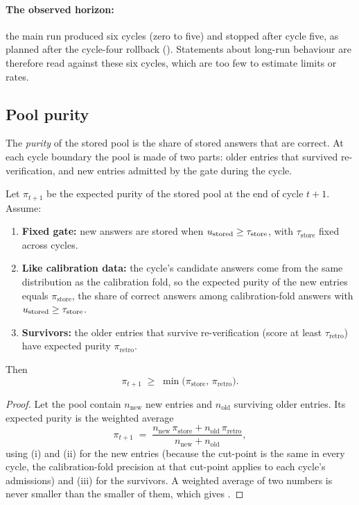 

\paragraph{The observed horizon:} the main run produced six cycles (zero to five) and stopped after cycle five, as planned after the cycle-four rollback (). Statements about long-run behaviour are therefore read against these six cycles, which are too few to estimate limits or rates.

\subsection{Pool purity}
\label{sec:theorem-purity}

The \emph{purity} of the stored pool is the share of stored answers that are correct. At each cycle boundary the pool is made of two parts: older entries that survived re-verification, and new entries admitted by the gate during the cycle.

\begin{theorem}
\label{thm:purity}
Let $\pi_{t+1}$ be the expected purity of the stored pool at the end of cycle $t+1$. Assume:
\begin{enumerate}[label=(\roman*)]
    \item \textbf{Fixed gate:} new answers are stored when $u_{\text{stored}} \ge \tau_{\text{store}}$, with $\tau_{\text{store}}$ fixed across cycles.
    \item \textbf{Like calibration data:} the cycle's candidate answers come from the same distribution as the calibration fold, so the expected purity of the new entries equals $\pi_{\text{store}}$, the share of correct answers among calibration-fold answers with $u_{\text{stored}} \ge \tau_{\text{store}}$.
    \item \textbf{Survivors:} the older entries that survive re-verification (score at least $\tau_{\text{retro}}$) have expected purity $\pi_{\text{retro}}$.
\end{enumerate}
Then
\begin{equation}
\pi_{t+1} \;\ge\; \min\!\big(\pi_{\text{store}},\,\pi_{\text{retro}}\big).
\label{eq:thm-purity}
\end{equation}
\end{theorem}

\begin{proof}
Let the pool contain $n_{\text{new}}$ new entries and $n_{\text{old}}$ surviving older entries. Its expected purity is the weighted average
\[
\pi_{t+1} \;=\; \frac{n_{\text{new}}\,\pi_{\text{store}} + n_{\text{old}}\,\pi_{\text{retro}}}{n_{\text{new}} + n_{\text{old}}},
\]
using (i) and (ii) for the new entries (because the cut-point is the same in every cycle, the calibration-fold precision at that cut-point applies to each cycle's admissions) and (iii) for the survivors. A weighted average of two numbers is never smaller than the smaller of them, which gives .
\end{proof}

